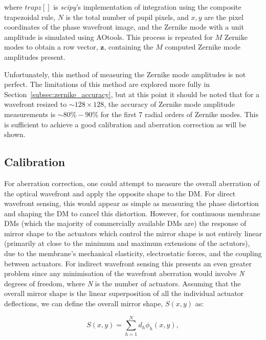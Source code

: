 where $trapz[]$ is \textit{scipy}'s implementation of integration using the 
composite trapezoidal rule, $N$ is the total number of pupil pixels, and 
$x,y$ are the pixel coordinates of the phase wavefront image, and the Zernike 
mode with a unit amplitude is simulated using 
AOtools\cite{virtanen2020scipy,townson2019aotools}. This process is repeated 
for $M$ Zernike modes to obtain a row vector, $\boldsymbol{z}$, containing the 
$M$ computed Zernike mode amplitudes present. 

Unfortunately, this method of measuring the Zernike mode amplitudes is not perfect. The limitations of this method are explored more fully in Section~\ref{subsec:zernike_accuracy}, but at this point it should be noted that for a wavefront resized to $\sim 128\times128$, the accuracy of Zernike mode amplitude measurements is $\sim 80\%-90\%$ for the first 7 radial orders of Zernike modes. This is sufficient to achieve a good calibration and aberration correction as will be shown.

\subsection{Calibration}
\label{subsec:calibration}

For aberration correction, one could attempt to measure the overall aberration of the optical wavefront and apply the opposite shape to the DM. For direct wavefront sensing, this would appear as simple as measuring the phase distortion and shaping the DM to cancel this distortion. However, for continuous membrane DMs (which the majority of commercially available DMs are) the response of mirror shape to the actuators which control the mirror shape is not entirely linear (primarily at close to the minimum and maximum extensions of the actutors), due to the membrane's mechanical elasticity, electrostatic forces, and the coupling between actuators\cite{Zhu:99}. For indirect wavefront sensing this presents an even greater problem since any minimisation of the wavefront aberration would involve \textit{N} degrees of freedom, where \textit{N} is the number of actuators. Assuming that the overall mirror shape is the linear superposition of all the individual actuator deflections, we can define the overall mirror shape, $S(x,y)$ as:

\begin{equation}\label{eq:surface_shape}
S(x,y) = \sum_{h=1}^{N} d_{h}\phi_{h}(x,y),
\end{equation}

